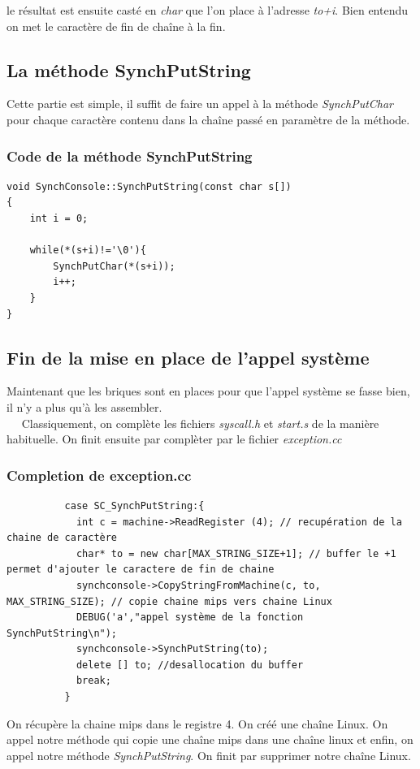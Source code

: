 \documentclass[a4paper,10pt]{article}
\begin{document}
 le résultat est ensuite casté en \emph{char} que l'on place à l'adresse \emph{to+i}. Bien entendu on met le caractère de fin de chaîne à la fin.
 \textcolor{NavyBlue}{\subsection{La méthode SynchPutString}}
 Cette partie est simple, il suffit de faire un appel à la méthode \emph{SynchPutChar} pour chaque caractère contenu dans la chaîne passé en paramètre de la
 méthode.
 \textcolor{TealBlue}{\subsubsection*{Code de la méthode SynchPutString}}
  \begin{lstlisting}
void SynchConsole::SynchPutString(const char s[])
{
	int i = 0;

	while(*(s+i)!='\0'){
		SynchPutChar(*(s+i));
		i++;
	}
}   
  \end{lstlisting}

   \textcolor{NavyBlue}{\subsection{Fin de la mise en place de l'appel système}}
   Maintenant que les briques sont en places pour que l'appel système se fasse bien, il n'y a plus qu'à les assembler. 
   \\~~
   Classiquement, on complète les fichiers \emph{syscall.h} et \emph{start.s} de la manière habituelle.
   On finit ensuite par complèter par le fichier \emph{exception.cc}
   \textcolor{TealBlue}{\subsubsection*{Completion de exception.cc}}
   \begin{lstlisting}
          case SC_SynchPutString:{
            int c = machine->ReadRegister (4); // recupération de la chaine de caractère
            char* to = new char[MAX_STRING_SIZE+1]; // buffer le +1 permet d'ajouter le caractere de fin de chaine
            synchconsole->CopyStringFromMachine(c, to, MAX_STRING_SIZE); // copie chaine mips vers chaine Linux
            DEBUG('a',"appel système de la fonction SynchPutString\n");
            synchconsole->SynchPutString(to);
            delete [] to; //desallocation du buffer
            break;
          }    
   \end{lstlisting}
  On récupère la chaine mips dans le registre 4. On créé une chaîne Linux. On appel notre méthode qui copie une chaîne mips dans une chaîne linux et enfin,
  on appel notre méthode \emph{SynchPutString}. On finit par supprimer notre chaîne Linux.
  
\end{document}

